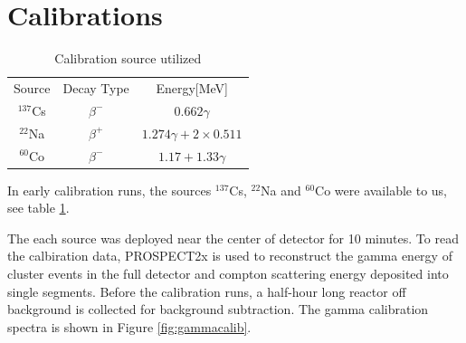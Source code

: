 \section{Calibrations}

\begin{table}
    \centering
    \begin{tabular}{c|c|c}
        Source & Decay Type & Energy[MeV]\\
        $^{137}$Cs  & $\beta^-$   & $0.662 \gamma$\\
        $^{22}$Na   & $\beta^+$   & $1.274 \gamma + 2\times0.511$ \\
        $^{60}$Co   & $\beta^-$   & $1.17 + 1.33 \gamma$
    \end{tabular}
    \caption{Calibration source utilized}
    \label{tab:src_table}
\end{table}

In early calibration runs, the sources $^{137}$Cs, $^{22}$Na and $^{60}$Co were available to us, see table \ref{tab:src_table}.

The each source was deployed near the center of detector for 10 minutes. To read the calbiration data, PROSPECT2x is used to reconstruct the gamma energy of cluster events in the full detector and compton scattering energy deposited into single segments. Before the calibration runs, a half-hour long reactor off background is collected for background subtraction. The gamma calibration spectra is shown in Figure \ref{fig:gammacalib}.

